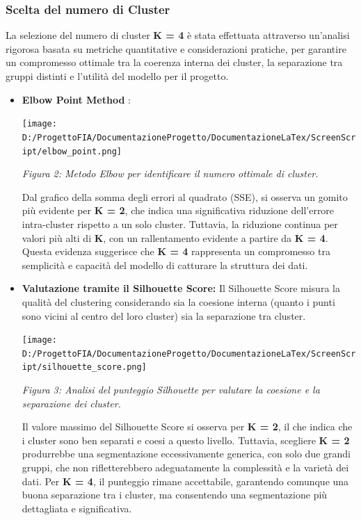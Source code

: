 \documentclass[a4paper,12pt]{article}
\begin{document}
	\subsubsection{Scelta del numero di Cluster}
La selezione del numero di cluster \textbf{K = 4} è stata effettuata attraverso un'analisi rigorosa basata su metriche quantitative e considerazioni pratiche, per garantire un compromesso ottimale tra la coerenza interna dei cluster, la separazione tra gruppi distinti e l'utilità del modello per il progetto.
		\begin{itemize}
			\item \textbf{Elbow Point Method} : 
				\begin{center}
					\texttt{[image: D:/ProgettoFIA/DocumentazioneProgetto/DocumentazioneLaTex/ScreenScript/elbow\_point.png]}

\textit{Figura 2: Metodo Elbow per identificare il numero ottimale di cluster.}
				\end{center}


Dal grafico della somma degli errori al quadrato (SSE), si osserva un gomito più evidente per \textbf{K = 2}, che indica una significativa riduzione dell'errore intra-cluster rispetto a un solo cluster. Tuttavia, la riduzione continua per valori più alti di \textbf{K}, con un rallentamento evidente a partire da \textbf{K = 4}. Questa evidenza suggerisce che \textbf{K = 4} rappresenta un compromesso tra semplicità e capacità del modello di catturare la struttura dei dati.

\newpage
			\item \textbf{Valutazione tramite il Silhouette Score: } Il Silhouette Score misura la qualità del clustering considerando sia la coesione interna (quanto i punti sono vicini al centro del loro cluster) sia la separazione tra cluster.

	\begin{center}
		\texttt{[image: D:/ProgettoFIA/DocumentazioneProgetto/DocumentazioneLaTex/ScreenScript/silhouette\_score.png]}

\textit{Figura 3: Analisi del punteggio Silhouette per valutare la coesione e la separazione dei cluster.}
	\end{center}


Il valore massimo del Silhouette Score si osserva per \textbf{K = 2}, il che indica che i cluster sono ben separati e coesi a questo livello. Tuttavia, scegliere \textbf{K = 2} produrrebbe una segmentazione eccessivamente generica, con solo due grandi gruppi, che non rifletterebbero adeguatamente la complessità e la varietà dei dati. Per \textbf{K = 4}, il punteggio rimane accettabile, garantendo comunque una buona separazione tra i cluster, ma consentendo una segmentazione più dettagliata e significativa.
		\end{itemize}
\end{document}
